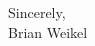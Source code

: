 \begin{comment}
\vspace{2.0ex}

I would enjoy discussing this position with you in the weeks to come. In the meantime, I am enclosing my curriculum vitae and list of courses taught.  If you require any additional materials or information, I am happy to supply it. Thank you very much for your consideration. \\

\end{comment}

\vspace{4.0ex}

Sincerely, \\
\vspace{2.0ex}
Brian Weikel
